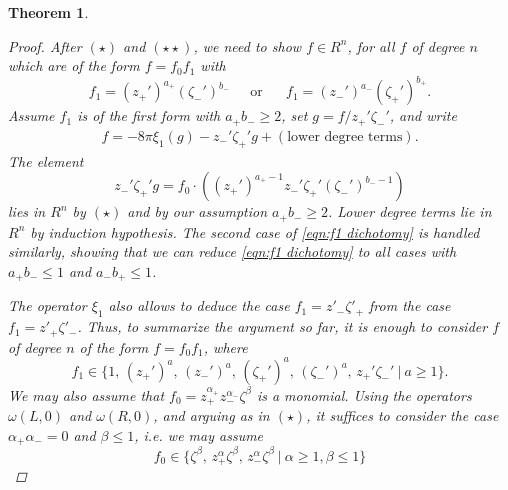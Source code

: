 \documentclass[reqno, 11pt]{amsart} %
\numberwithin{equation}{section}
\theoremstyle{plain}
\newtheorem{theorem}{Theorem}[section]
\theoremstyle{definition}
\theoremstyle{remark}
\begin{document}
\begin{theorem}
\begin{proof}
After $(\star)$ and $(\star\star)$, we need to show $f\in R^n$, for all $f$ of degree $n$ which are of the form $f = f_0f_1$ with
\begin{equation} \label{eqn:f1 dichotomy}
f_1 = (z_+')^{a_+} (\zeta_-')^{b_-} \quad\ \ \text{or}\ \ \ \! \quad f_1 = (z_-')^{a_-}(\zeta_+')^{b_+}.
\end{equation}
Assume $f_1$ is of the first form with $a_+b_-\geq 2$, set $g = f/z_+' \zeta_-' $, and write
\begin{align*}
f =  - 8 \pi \xi_1(g) -  z_-' \zeta_+' g + (\text{lower degree terms}).
\end{align*}
The element
\[
z_-' \zeta_+' g = f_0 \cdot \left( (z_+')^{a_+ - 1}z_-' \zeta_+' (\zeta_-')^{b_--1} \right)
\]
lies in $R^n$ by $(\star)$ and by our assumption $a_+b_- \geq 2$. Lower degree terms lie in $R^n$ by induction hypothesis. The second case of \eqref{eqn:f1 dichotomy} is handled similarly, showing that we can reduce \eqref{eqn:f1 dichotomy} to all cases with $a_+b_- \leq 1$ and $a_-b_+\leq 1$.

The operator $ξ_1$ also allows to deduce the case $f_1 = z'_-ζ'_+$ from the case $f_1 = z'_+ζ'_-$. Thus, to summarize the argument so far, it is enough to consider $f$ of degree $n$ of the form $f= f_0 f_1$, where
\begin{equation} \label{eqn:f1 opts}
f_1 \in \{1,\, (z_+')^{a},\, (z_-')^{a},\, (\zeta_+')^a,\, (\zeta_-')^a,\, z_+' \zeta_-'\ | \ a \geq 1 \}.
\end{equation}
We may also assume that $f_0 = z_+^{\alpha_+} z_-^{\alpha_-} \zeta^{\beta}$ is a monomial. Using the operators $\omega(L,0)$ and $\omega(R,0)$, and arguing as in $(\star)$, it suffices to consider the case $\alpha_+ \alpha_- = 0$ and $\beta \leq 1$, i.e. we may assume
\begin{equation} \label{eqn:f0 opts}
f_0 \in \{  \zeta^{\beta},  \, z_+^{\alpha}\zeta^{\beta}, \,   z_-^{\alpha} \zeta^{\beta} \ | \ \alpha \geq 1, \beta \leq 1\}
\end{equation}


\end{proof}
\end{theorem}
\end{document}
